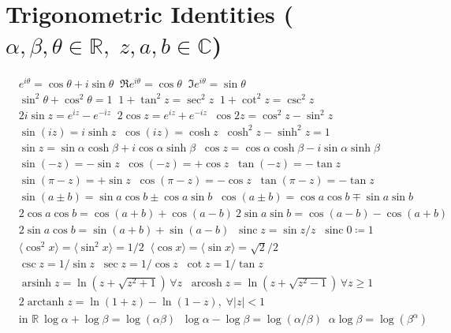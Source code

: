 \section*{Trigonometric Identities \normalfont\scriptsize{($\alpha,\beta,\theta\in\mathbb{R},\; z,a,b\in\mathbb{C}$)}}
\begin{align*}
&e^{i\theta}=\cos\theta+i\sin\theta \;\; \Re e^{i\theta}=\cos\theta \;\; \Im e^{i\theta}=\sin\theta \\
&\sin^2\theta+\cos^2\theta=1 \;\; 1+\tan^2 z=\sec^2 z \;\; 1+\cot^2z=\csc^2z \\
&2i\sin z=e^{iz}-e^{-iz} \;\; 2\cos z=e^{iz}+e^{-iz} \;\; \cos2z=\cos^2 z-\sin^2 z \\
&\sin(iz)=i\sinh z \;\; \cos(iz)=\cosh z \;\; \cosh^2z-\sinh^2z=1 \\
&\sin z=\sin\alpha\cosh\beta+i\cos\alpha\sinh\beta \;\; \cos z=\cos\alpha\cosh\beta-i\sin\alpha\sinh\beta \\
&\sin(-z)=-\sin z \;\; \cos(-z)=+\cos z \;\; \tan(-z)=-\tan z \\
&\sin(\pi-z)=+\sin z \;\; \cos(\pi-z)=-\cos z \;\; \tan(\pi-z)=-\tan z \\
&\sin(a\pm b)=\sin a\cos b\pm\cos a\sin b \;\; \cos(a\pm b)=\cos a\cos b\mp\sin a\sin b \\
&2\cos a\cos b=\cos(a+b)+\cos(a-b) \ 2\sin a\sin b=\cos(a-b)-\cos(a+b) \\
&2\sin a\cos b=\sin(a+b)+\sin(a-b) \;\; \operatorname{sinc}z=\sin z/z \;\; \operatorname{sinc}0\coloneqq1 \\
&\langle\cos^2 x\rangle=\langle\sin^2 x\rangle=1/2 \;\; \langle\cos x\rangle=\langle\sin x\rangle=\sqrt{2}/2 \\
&\csc z=1/\sin z \;\; \sec z=1/\cos z \;\; \cot z=1/\tan z \\
&\operatorname{arsinh}z=\ln(z+\sqrt{z^2+1})\, \forall z \;\; \operatorname{arcosh}z=\ln(z+\sqrt{z^2-1})\, \forall z\geq1 \\
&2\operatorname{arctanh}z=\ln(1+z)-\ln(1-z),\; \forall |z|<1 \\
&\text{in } \mathbb{R}\: \log \alpha+\log \beta=\log(\alpha\beta) \;\; \log \alpha-\log \beta=\log(\alpha/\beta) \;\; \alpha\log \beta=\log(\beta^\alpha)  
\end{align*}

